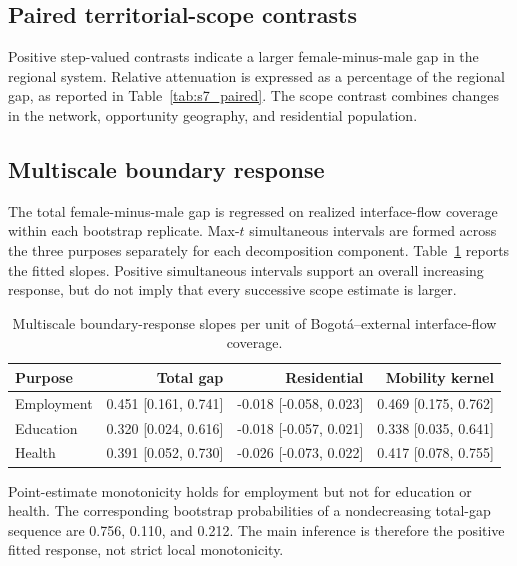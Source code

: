 \documentclass[11pt]{article}
\begin{document}



\subsection{Paired territorial-scope contrasts}
Positive step-valued contrasts indicate a larger female-minus-male gap in the regional
system. Relative attenuation is expressed as a percentage of the regional gap, as
reported in Table~\ref{tab:s7_paired}. The scope contrast combines changes in the
network, opportunity geography, and residential population.



\subsection{Multiscale boundary response}
The total female-minus-male gap is regressed on realized interface-flow coverage within
each bootstrap replicate. Max-$t$ simultaneous intervals are formed across the three
purposes separately for each decomposition component. Table~\ref{tab:s8_multiscale}
reports the fitted slopes. Positive simultaneous intervals support an overall increasing
response, but do not imply that every successive scope estimate is larger.

\begin{table}[ht]
\centering
\caption{Multiscale boundary-response slopes per unit of Bogotá--external interface-flow coverage.}
\label{tab:s8_multiscale}
\begin{tabular}{lrrr}
\toprule
Purpose & Total gap & Residential & Mobility kernel \\
\midrule
Employment & 0.451 [0.161, 0.741] & -0.018 [-0.058, 0.023] & 0.469 [0.175, 0.762] \\
Education  & 0.320 [0.024, 0.616] & -0.018 [-0.057, 0.021] & 0.338 [0.035, 0.641] \\
Health     & 0.391 [0.052, 0.730] & -0.026 [-0.073, 0.022] & 0.417 [0.078, 0.755] \\
\bottomrule
\end{tabular}
\end{table}

Point-estimate monotonicity holds for employment but not for education or health.
The corresponding bootstrap probabilities of a nondecreasing total-gap sequence are
0.756, 0.110, and 0.212. The main inference is therefore the positive fitted response,
not strict local monotonicity.
\end{document}
